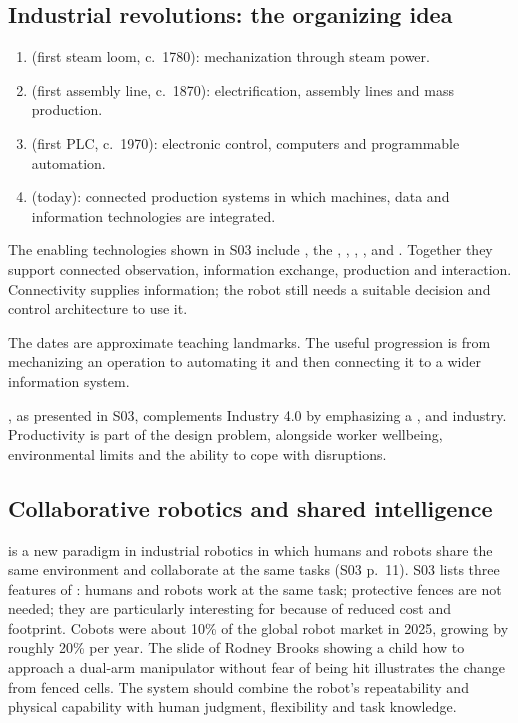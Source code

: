 \subsection{Industrial revolutions: the organizing idea}
\begin{enumerate}
\item {} (first steam loom, c.\ 1780): mechanization through steam power.
\item {} (first assembly line, c.\ 1870): electrification, assembly lines and mass production.
\item {} (first PLC, c.\ 1970): electronic control, computers and programmable automation.
\item {} (today): connected production systems in which machines, data and information technologies are integrated.
\end{enumerate}
The enabling technologies shown in S03 include , the , , , , and . Together they support connected observation, information exchange, production and interaction. Connectivity supplies information; the robot still needs a suitable decision and control architecture to use it.

The dates are approximate teaching landmarks. The useful progression is from mechanizing an operation to automating it and then connecting it to a wider information system.

, as presented in S03, complements Industry 4.0 by emphasizing a ,  and  industry. Productivity is part of the design problem, alongside worker wellbeing, environmental limits and the ability to cope with disruptions.

\subsection{Collaborative robotics and shared intelligence}
 is a new paradigm in industrial robotics in which humans and robots share the same environment and collaborate at the same tasks (S03 p.~11). S03 lists three features of : humans and robots work at the same task; protective fences are not needed; they are particularly interesting for  because of reduced cost and footprint. Cobots were about 10\% of the global robot market in 2025, growing by roughly 20\% per year. The slide of Rodney Brooks showing a child how to approach a dual-arm manipulator without fear of being hit illustrates the change from fenced cells. The system should combine the robot's repeatability and physical capability with human judgment, flexibility and task knowledge.

